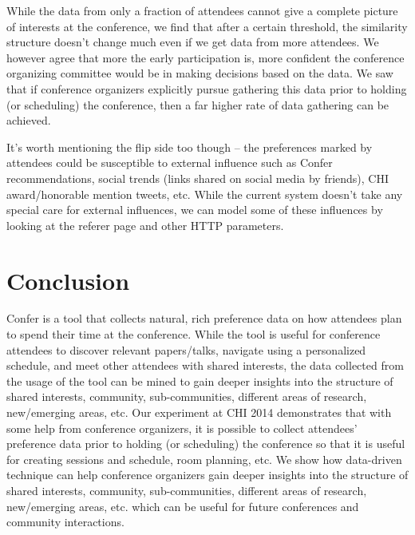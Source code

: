 \documentclass{sigchi}
\begin{document}
While the data from only a fraction of attendees cannot give a complete picture of interests at the conference, we find that after a certain threshold, the similarity structure doesn't change much even if we get data from more attendees. We however agree that more the early participation is, more confident the conference organizing committee would be in making decisions based on the data. We saw that if conference organizers explicitly pursue gathering this data prior to holding (or scheduling) the conference, then a far higher rate of data gathering can be achieved.

It's worth mentioning the flip side too though -- the preferences marked by attendees could be susceptible to external influence such as Confer recommendations, social trends (links shared on social media by friends), CHI award/honorable mention tweets, etc. While the current system doesn't take any special care for external influences, we can model some of these influences by looking at the referer page and other HTTP parameters.

\section{Conclusion}
Confer is a tool that collects natural, rich preference data on how attendees plan to spend their time at the conference. While the tool is useful for conference attendees to discover relevant papers/talks, navigate using a personalized schedule, and meet other attendees with shared interests, the data collected from the usage of the tool can be mined to gain deeper insights into the structure of shared interests, community, sub-communities, different areas of research, new/emerging areas, etc. Our experiment at CHI 2014 demonstrates that with some help from conference organizers, it is possible to collect attendees' preference data prior to holding (or scheduling) the conference so that it is useful for creating sessions and schedule, room planning, etc. We show how data-driven technique can help conference organizers gain deeper insights into the structure of shared interests, community, sub-communities, different areas of research, new/emerging areas, etc. which can be useful for future conferences and community interactions.


%
%
%
%
%
\balance



\end{document}
